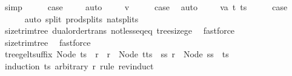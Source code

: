 \begin{isabellebody}
\ simp\isanewline
\ \ \isamarkupfalse%
\ \isamarkupfalse%
\ {\isacharquery}{\kern0pt}case\ \isamarkupfalse%
\ {}\ \isamarkupfalse%
\ auto\isanewline
{}\isamarkupfalse%
\isanewline
\ \ \isamarkupfalse%
\ {\isacharparenleft}{\kern0pt}{}\ v{\isacharparenright}{\kern0pt}\isanewline
\ \ \isamarkupfalse%
\ \isamarkupfalse%
\ {\isacharquery}{\kern0pt}case\ \isamarkupfalse%
\ auto\isanewline
{}\isamarkupfalse%
\isanewline
\ \ \isamarkupfalse%
\ {\isacharparenleft}{\kern0pt}{}\ va\ t\ ts{\isacharparenright}{\kern0pt}\isanewline
\ \ \isamarkupfalse%
\ \isamarkupfalse%
\ {\isacharquery}{\kern0pt}case\isanewline
\ \ \ \ \isamarkupfalse%
\ {\isacharparenleft}{\kern0pt}auto\ split{\isacharcolon}{\kern0pt}\ prod{\isachardot}{\kern0pt}splits\ nat{\isachardot}{\kern0pt}splits{\isacharparenright}{\kern0pt}\isanewline
\ \ \ \ \isamarkupfalse%
\ size{\isacharunderscore}{\kern0pt}trim{\isacharunderscore}{\kern0pt}tree\ dual{\isacharunderscore}{\kern0pt}order{\isachardot}{\kern0pt}trans\ not{\isacharunderscore}{\kern0pt}less{\isacharunderscore}{\kern0pt}eq{\isacharunderscore}{\kern0pt}eq\ tree{\isacharunderscore}{\kern0pt}size{\isacharunderscore}{\kern0pt}ge{\isacharunderscore}{\kern0pt}{}\ \isamarkupfalse%
\ fastforce\isanewline
\ \ \ \ \isamarkupfalse%
\ size{\isacharunderscore}{\kern0pt}trim{\isacharunderscore}{\kern0pt}tree\ \isamarkupfalse%
\ fastforce\isanewline
{}\isamarkupfalse%
%
\endisatagproof
{\isafoldproof}%
%
\isadelimproof
\isanewline
%
\endisadelimproof
\isanewline
{}\isamarkupfalse%
\ tree{\isacharunderscore}{\kern0pt}ge{\isacharunderscore}{\kern0pt}lt{\isacharunderscore}{\kern0pt}suffix{\isacharcolon}{\kern0pt}\ {\isachardoublequoteopen}Node\ ts\ {\isasymle}\ r\ {\isasymLongrightarrow}\ r\ {\isacharless}{\kern0pt}\ Node\ {\isacharparenleft}{\kern0pt}t{\isacharhash}{\kern0pt}ts{\isacharparenright}{\kern0pt}\ {\isasymLongrightarrow}\ {\isasymexists}ss{\isachardot}{\kern0pt}\ r\ {\isacharequal}{\kern0pt}\ Node\ {\isacharparenleft}{\kern0pt}ss\ {\isacharat}{\kern0pt}\ ts{\isacharparenright}{\kern0pt}{\isachardoublequoteclose}\isanewline
%
\isadelimproof
%
\endisadelimproof
%
\isatagproof
{}\isamarkupfalse%
\ {\isacharparenleft}{\kern0pt}induction\ ts\ arbitrary{\isacharcolon}{\kern0pt}\ r\ rule{\isacharcolon}{\kern0pt}\ rev{\isacharunderscore}{\kern0pt}induct{\isacharparenright}{\kern0pt}\isanewline

\end{isabellebody}
